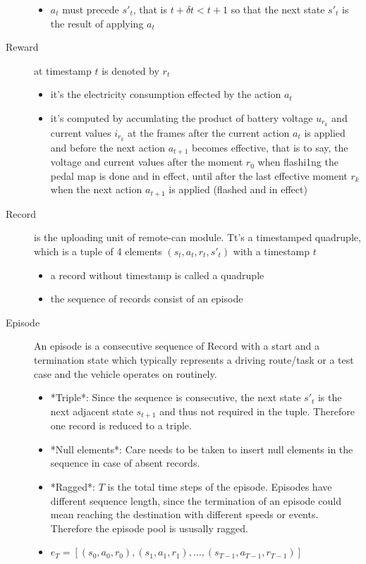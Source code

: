 \documentclass{article}
\begin{document}
\begin{description}
\begin{itemize}
        \item $a_t$ must precede $s'_t$, that is $t+\delta t < t+1$ so that the next state $s'_t$ is the result of applying $a_t$
      \end{itemize}
    \item[Reward] at timestamp $t$ is denoted by $r_t$
      \begin{itemize}
        \item it's the electricity consumption effected by the action $a_t$
        \item it's computed by accumlating the product of battery voltage $u_{r_k}$ and current values $i_{r_k}$ at the frames after the current action $a_t$ is applied and before the next action $a_{t+1}$ becomes effective, that is to say, the voltage and current values after the moment $r_0$  when flashi1ng the pedal map is done and in effect, until after the last effective moment $r_k$  when the next action $a_{t+1}$ is applied (flashed and in effect)
      \end{itemize}
    \item[Record] is the uploading unit of remote-can module. Tt's a timestamped quadruple, which is a tuple of 4 elements $(s_t, a_t, r_t, s'_t)$ with a timestamp $t$
      \begin{itemize}
        \item a record without timestamp is called a quadruple
        \item the sequence of records consist of an episode
      \end{itemize}
    \item[Episode] An episode is a consecutive sequence of Record with a start and a termination state which typically represents a driving route/task or a test case and the vehicle operates on routinely.
      \begin{itemize}
        \item *Triple*: Since the sequence is consecutive, the next state $s'_t$ is the next adjacent state $s_{t+1}$ and thus not required in the tuple. Therefore one record is reduced to a triple.
        \item *Null elements*: Care needs to be taken to insert null elements in the sequence in case of absent records.
        \item *Ragged*: $T$ is the total time steps of the episode. Episodes have different sequence length, since the termination of an episode could mean reaching the destination with different speeds or events. Therefore the episode pool  is ususally ragged.
        \item $e_T=[(s_0,a_0,r_0),(s_1,a_1,r_1), \ldots,(s_{T-1},a_{T-1},r_{T-1})]$
      \end{itemize}
\end{description}
\end{document}
